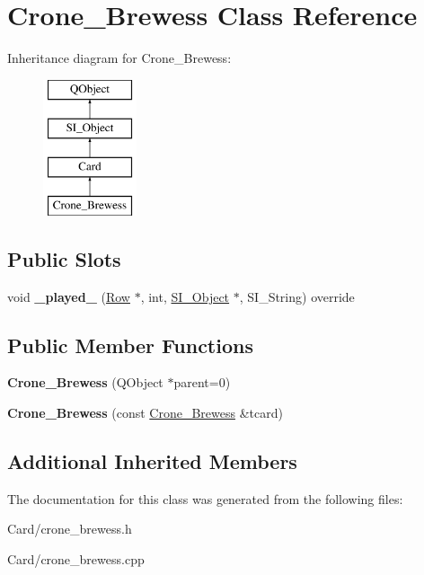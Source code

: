\hypertarget{class_crone___brewess}{}\section{Crone\+\_\+\+Brewess Class Reference}
\label{class_crone___brewess}
Inheritance diagram for Crone\+\_\+\+Brewess\+:\begin{figure}[H]
\begin{center}
\leavevmode
\includegraphics[height=4.000000cm]{class_crone___brewess}
\end{center}
\end{figure}
\subsection*{Public Slots}
\begin{DoxyCompactItemize}
\item 
\mbox{\label{class_crone___brewess_aab1a24bfde012ebbe77648968dbcacb4}} 
void {\bfseries \+\_\+played\+\_\+} (\hyperlink{class_card_set}{Row} $\ast$, int, \hyperlink{class_s_i___object}{S\+I\+\_\+\+Object} $\ast$, S\+I\+\_\+\+String) override
\end{DoxyCompactItemize}
\subsection*{Public Member Functions}
\begin{DoxyCompactItemize}
\item 
\mbox{\label{class_crone___brewess_ad490433e4c5e68ab99c7486583bb48df}} 
{\bfseries Crone\+\_\+\+Brewess} (Q\+Object $\ast$parent=0)
\item 
\mbox{\label{class_crone___brewess_a80b81a784ab05080070903eb41731908}} 
{\bfseries Crone\+\_\+\+Brewess} (const \hyperlink{class_crone___brewess}{Crone\+\_\+\+Brewess} \&tcard)
\end{DoxyCompactItemize}
\subsection*{Additional Inherited Members}


The documentation for this class was generated from the following files\+:\begin{DoxyCompactItemize}
\item 
Card/crone\+\_\+brewess.\+h\item 
Card/crone\+\_\+brewess.\+cpp\end{DoxyCompactItemize}
